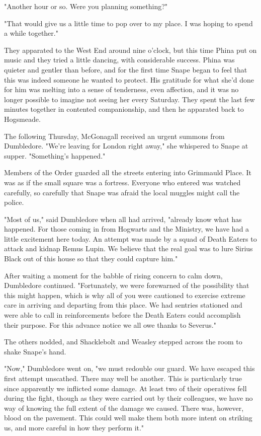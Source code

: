 "Another hour or so. Were you planning something?"

"That would give us a little time to pop over to my place. I was hoping to spend a while together."

They apparated to the West End around nine o'clock, but this time Phina put on music and they tried a little dancing, with considerable success. Phina was quieter and gentler than before, and for the first time Snape began to feel that this was indeed someone he wanted to protect. His gratitude for what she'd done for him was melting into a sense of tenderness, even affection, and it was no longer possible to imagine not seeing her every Saturday. They spent the last few minutes together in contented companionship, and then he apparated back to Hogsmeade.

The following Thursday, McGonagall received an urgent summons from Dumbledore. "We're leaving for London right away," she whispered to Snape at supper. "Something's happened."

Members of the Order guarded all the streets entering into Grimmauld Place. It was as if the small square was a fortress. Everyone who entered was watched carefully, so carefully that Snape was afraid the local muggles might call the police.

"Most of us," said Dumbledore when all had arrived, "already know what has happened. For those coming in from Hogwarts and the Ministry, we have had a little excitement here today. An attempt was made by a squad of Death Eaters to attack and kidnap Remus Lupin. We believe that the real goal was to lure Sirius Black out of this house so that they could capture him."

After waiting a moment for the babble of rising concern to calm down, Dumbledore continued. "Fortunately, we were forewarned of the possibility that this might happen, which is why all of you were cautioned to exercise extreme care in arriving and departing from this place. We had sentries stationed and were able to call in reinforcements before the Death Eaters could accomplish their purpose. For this advance notice we all owe thanks to Severus."

The others nodded, and Shacklebolt and Weasley stepped across the room to shake Snape's hand.

"Now," Dumbledore went on, "we must redouble our guard. We have escaped this first attempt unscathed. There may well be another. This is particularly true since apparently we inflicted some damage. At least two of their operatives fell during the fight, though as they were carried out by their colleagues, we have no way of knowing the full extent of the damage we caused. There was, however, blood on the pavement. This could well make them both more intent on striking us, and more careful in how they perform it."

